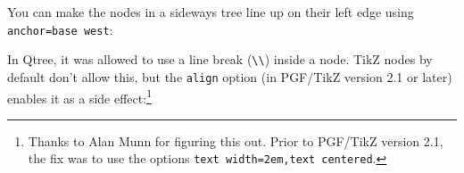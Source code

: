 \documentclass{article}
\begin{document}
You can make the nodes in a sideways tree line up on their left edge using \verb|anchor=base west|:
\begin{center}
\begin{SideBySideExample}
\end{SideBySideExample}
\end{center}

In Qtree, it was allowed to use a line break (\verb|\\|) inside a node. TikZ nodes by default don't allow this, but the \verb|align| option (in PGF/TikZ version 2.1 or later) enables it as a side effect:\footnote{Thanks to Alan Munn for figuring this out. Prior to PGF/TikZ version 2.1, the fix was to use the options \verb|text width=2em,text centered|.}
\begin{center}
\begin{SideBySideExample}
\end{SideBySideExample}
\end{center}
\end{document}

